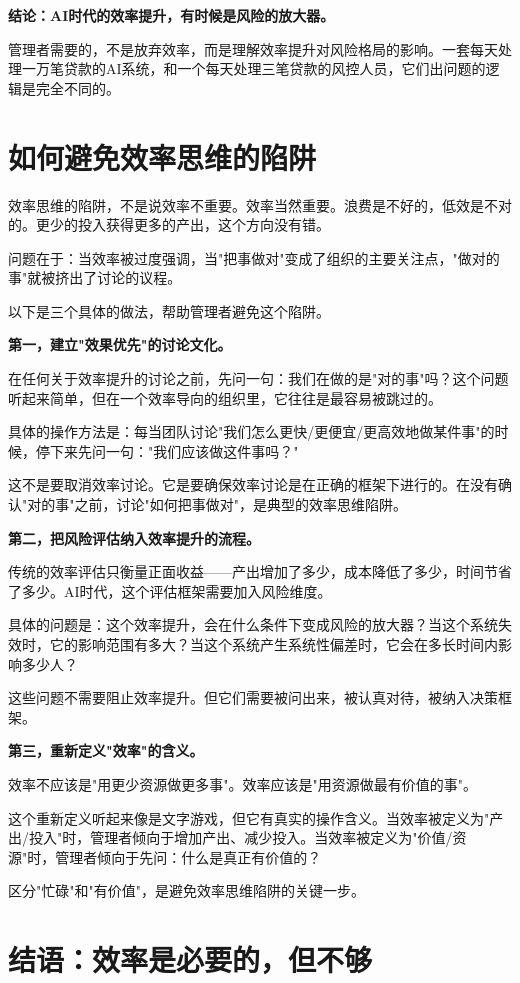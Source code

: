 \textbf{结论：AI时代的效率提升，有时候是风险的放大器。}

管理者需要的，不是放弃效率，而是理解效率提升对风险格局的影响。一套每天处理一万笔贷款的AI系统，和一个每天处理三笔贷款的风控人员，它们出问题的逻辑是完全不同的。


\section{如何避免效率思维的陷阱}


效率思维的陷阱，不是说效率不重要。效率当然重要。浪费是不好的，低效是不对的。更少的投入获得更多的产出，这个方向没有错。

问题在于：当效率被过度强调，当"把事做对"变成了组织的主要关注点，"做对的事"就被挤出了讨论的议程。

以下是三个具体的做法，帮助管理者避免这个陷阱。

\textbf{第一，建立"效果优先"的讨论文化。}

在任何关于效率提升的讨论之前，先问一句：我们在做的是"对的事"吗？这个问题听起来简单，但在一个效率导向的组织里，它往往是最容易被跳过的。

具体的操作方法是：每当团队讨论"我们怎么更快/更便宜/更高效地做某件事"的时候，停下来先问一句："我们应该做这件事吗？"

这不是要取消效率讨论。它是要确保效率讨论是在正确的框架下进行的。在没有确认"对的事"之前，讨论"如何把事做对"，是典型的效率思维陷阱。

\textbf{第二，把风险评估纳入效率提升的流程。}

传统的效率评估只衡量正面收益——产出增加了多少，成本降低了多少，时间节省了多少。AI时代，这个评估框架需要加入风险维度。

具体的问题是：这个效率提升，会在什么条件下变成风险的放大器？当这个系统失效时，它的影响范围有多大？当这个系统产生系统性偏差时，它会在多长时间内影响多少人？

这些问题不需要阻止效率提升。但它们需要被问出来，被认真对待，被纳入决策框架。

\textbf{第三，重新定义"效率"的含义。}

效率不应该是"用更少资源做更多事"。效率应该是"用资源做最有价值的事"。

这个重新定义听起来像是文字游戏，但它有真实的操作含义。当效率被定义为"产出/投入"时，管理者倾向于增加产出、减少投入。当效率被定义为"价值/资源"时，管理者倾向于先问：什么是真正有价值的？

区分"忙碌"和"有价值"，是避免效率思维陷阱的关键一步。


\section{结语：效率是必要的，但不够}


